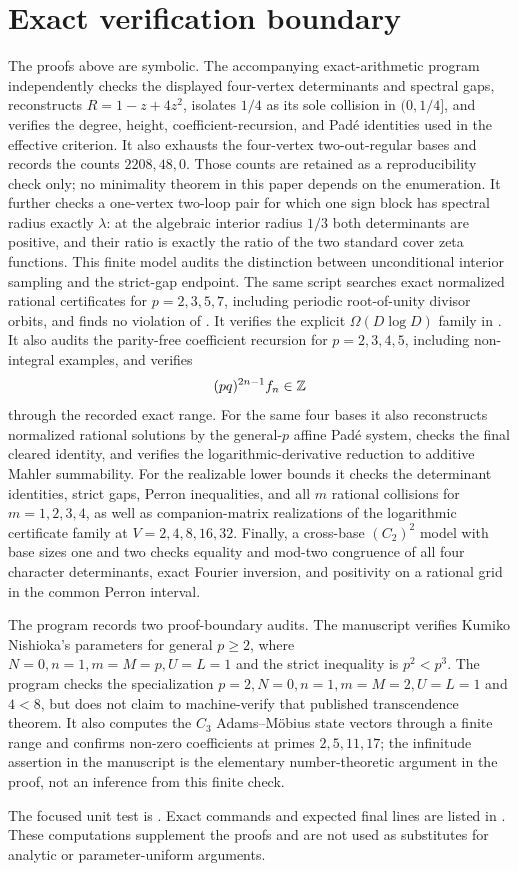 \section{Exact verification boundary}
\label{sec:exactness}

The proofs above are symbolic.  The accompanying exact-arithmetic program
 independently checks the displayed
four-vertex determinants and spectral gaps, reconstructs
\(R=1-z+4z^2\), isolates \(1/4\) as its sole collision in
\((0,1/4]\), and verifies the degree, height, coefficient-recursion, and
Pad\'e identities used in the effective criterion.  It also exhausts the
four-vertex two-out-regular bases and records the counts \(2208,48,0\).
Those counts are retained as a reproducibility check only; no minimality
theorem in this paper depends on the enumeration.  It further checks a
one-vertex two-loop pair for which one sign block has
spectral radius exactly \(\lambda\): at the algebraic interior radius \(1/3\)
both determinants are positive, and their ratio is exactly the ratio of the
two standard cover zeta functions.  This finite model audits the distinction
between unconditional interior sampling and the strict-gap endpoint.
The same script searches exact normalized rational certificates for
\(p=2,3,5,7\), including periodic root-of-unity divisor orbits, and finds no
violation of .  It verifies the
explicit \(\Omega(D\log D)\) family in
.  It also audits the
parity-free coefficient recursion for \(p=2,3,4,5\), including non-integral
examples, and verifies
\[
 (pq)^{2n-1}f_n\in\mathbb{Z}
\]
through the recorded exact range.  For the same four bases it also reconstructs
normalized rational solutions by the general-\(p\) affine Pad\'e system,
checks the final cleared identity, and verifies the logarithmic-derivative
reduction to additive Mahler summability.  For the realizable lower bounds it checks
the determinant identities, strict gaps, Perron inequalities, and all
\(m\) rational collisions for \(m=1,2,3,4\), as well as companion-matrix
realizations of the logarithmic certificate family at
\(V=2,4,8,16,32\).  Finally, a cross-base
\((C_2)^2\) model with base sizes one and two checks equality and mod-two
congruence of all four character determinants, exact Fourier inversion, and
positivity on a rational grid in the common Perron interval.

The program records two proof-boundary audits.  The manuscript verifies
Kumiko Nishioka's parameters for general \(p\ge2\), where
\(N=0,n=1,m=M=p,U=L=1\) and the strict inequality is \(p^2<p^3\).
The program checks the specialization
\(p=2,N=0,n=1,m=M=2,U=L=1\) and \(4<8\), but does not claim to
machine-verify that published transcendence theorem.  It also computes the
\(C_3\) Adams--M\"obius state vectors through a
finite range and confirms non-zero coefficients at primes
\(2,5,11,17\); the infinitude assertion in the manuscript is the elementary
number-theoretic argument in the proof, not an inference from this finite
check.

The focused unit test is .  Exact
commands and expected final lines are listed in .  These
computations supplement the proofs and are not used as substitutes for
analytic or parameter-uniform arguments.
